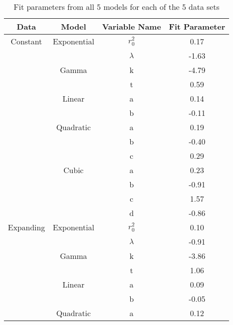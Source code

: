 \documentclass[11pt]{article}
\begin{document}
\addtocounter{table}{-1}
\begin{longtable}{c c c c}
\caption{Fit parameters from all 5 models for each of the 5 data sets}\label{tab:b}\\
\hline
Data       & Model       & Variable Name              & Fit Parameter \\ 
\hline
\endhead
\hline
\endfoot
Constant   & Exponential & $r^2_0$ 					  & 0.17          \\ 
           &             & $\lambda$                  & -1.63         \\ 
           & Gamma       & k                          & -4.79         \\ 
           &             & t                          & 0.59          \\  
           & Linear      & a                          & 0.14          \\  
           &             & b                          & -0.11         \\  
           & Quadratic   & a                          & 0.19          \\  
           &             & b                          & -0.40         \\  
           &             & c                          & 0.29          \\  
           & Cubic       & a                          & 0.23          \\  
           &             & b                          & -0.91         \\  
           &             & c                          & 1.57          \\  
           &             & d                          & -0.86         \\  \hline
Expanding  & Exponential & $r^2_0$					  & 0.10          \\  
           &             & $\lambda$                  & -0.91         \\  
           & Gamma       & k                          & -3.86         \\  
           &             & t                          & 1.06          \\  
           & Linear      & a                          & 0.09          \\  
           &             & b                          & -0.05         \\  
           & Quadratic   & a                          & 0.12          \\  

\end{longtable}
\end{document}
